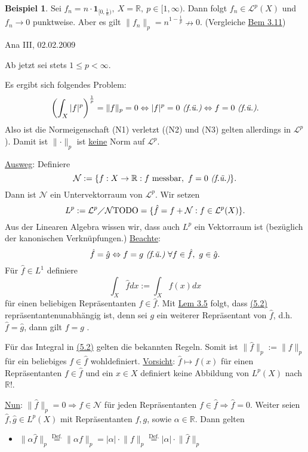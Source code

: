 \documentclass[a4paper]{report}
\newcommand{\doubleOne}{\textbf{1}}
\newcommand{\R}{\mathbb{R}}
\newcommand{\Leb}{\mathcal{L}}
\newcommand{\jlabel}[1]{\label{j_#1}}
\newcommand{\jhyperref}[2]{\hyperref[j_#1]{#2}}
\newcommand{\jlink}[1]{\jhyperref{#1}{#1}}
\newcommand{\fu}{\text{\textit{(f.ü.)}}}
\newcommand{\jabb}[3]{ #1: #2 \rightarrow #3 }
\newcommand{\jspace}{\vspace{8pt}}
\newcommand{\jspacesmall}{\vspace{4pt}}
\newcommand{\jdate}[1]{\jspacesmall\begin{center}\jlabel{#1}\tiny{Ana III, #1}\end{center}}
\theoremstyle{plain}
\theoremstyle{definition}
\newtheorem*{expl*}{Beispiel}
\begin{document}
{{{{\begin{expl*}
    Sei $f_n = n\cdot \doubleOne_{[0,\frac{1}{n})},\ X=\R,\ p\in [1,\infty)$. Dann folgt $f_n \in \Leb^p(X)$ und $f_n \to 0$ punktweise. Aber es gilt $\lVert f_n \rVert_p = n^{1-\frac{1}{p}} \nrightarrow 0.$ (Vergleiche \jlink{Bem 3.11})
\end{expl*}


\jdate{02.02.2009}


Ab jetzt sei stets $1\le p < \infty$.

\jspace
Es ergibt sich folgendes Problem:
\[
    \left(\int_X |f|^p \right)^\frac{1}{p} = \lVert f \rVert_p = 0 \Leftrightarrow |f|^p=0\ \fu \Leftrightarrow f = 0\ \fu.
\]
Also ist die Normeigenschaft (N1) verletzt ((N2) und (N3) gelten allerdings in $\Leb^p$). Damit ist $\lVert \cdot \rVert_p$ ist \uline{keine} Norm auf $\Leb^p$.

\jspace

\uline{Ausweg}: Definiere
\[
    \mathcal{N} := \{\jabb{f}{X}{\R}: f \text{ messbar},\ f=0 \ \fu\}.
\]
Dann ist $\mathcal{N}$ ein Untervektorraum von $\Leb^p$. Wir setzen
\begin{equation}
    \jlabel{(5.1)}
    L^p:= \Leb^p \diagup \mathcal{N} \text{TODO} = \{\hat{f} = f + \mathcal{N} : f \in \Leb^p(X) \}.
\end{equation}
Aus der Linearen Algebra wissen wir, dass auch $L^p$ ein Vektorraum ist (bezüglich der kanonischen Verknüpfungen.)
\jspacesmall
\uline{Beachte}:
\[
    \hat{f} = \hat{g} \Leftrightarrow f=g\ \fu\ \forall f\in\hat{f},\ g\in\hat{g}.
\]
Für $\hat{f}\in L^1$ definiere
\begin{equation}
    \jlabel{(5.2)}
    \int_X \hat{f} dx := \int_X f(x) dx
\end{equation}
für einen beliebigen Repräsentanten $f\in \hat{f}$. Mit \jlink{Lem 3.5} folgt, dass \jlink{(5.2)} repräsentantenunabhängig ist, denn sei $g$ ein weiterer Repräsentant von $\hat{f}$, d.h. $\hat{f} = \hat{g}$, dann gilt $f=g$ \fu.

\jspace

Für das Integral in \jlink{(5.2)} gelten die bekannten Regeln. Somit ist $\lVert \hat{f} \rVert_p := \lVert f \rVert_p$ für ein beliebiges $f \in \hat{f}$ wohldefiniert.
\jspacesmall
\uline{Vorsicht}: $\hat{f} \mapsto f(x)$ für einen Repräsentanten $f\in \hat{f}$ und ein $x\in X$ definiert keine Abbildung von $L^p(X)$ nach $\R$!.

\jspace

 \uline{Nun}: $\lVert \hat{f} \rVert_p = 0 \Rightarrow f \in \mathcal{N}$ für jeden Repräsentanten $f\in \hat{f} \Rightarrow \hat{f} =0$. Weiter seien $\hat{f}, \hat{g} \in L^p(X)$ mit Repräsentanten $f,g$, sowie $\alpha \in \R$. Dann gelten
\begin{itemize}
    \item $\lVert \alpha \hat{f}\rVert_p \overset{\text{Def.}}{=} \lVert \alpha f \rVert_p = |\alpha|\cdot \lVert f \rVert_p \overset{\text{Def.}}{=} |\alpha|\cdot \lVert \hat{f} \rVert_p$


\end{itemize}}}}}
\end{document}
